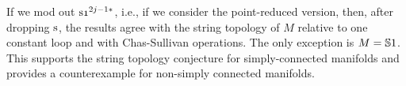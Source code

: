\documentclass[\MainFolder/Text.tex]{subfiles}
\begin{document}
If we mod out $\Susp \NOne^{2j-1*}$, i.e., if we consider the point-reduced version, then, after dropping $\mathrm{s}$, the results agree with the string topology of $M$ relative to one constant loop and with Chas-Sullivan operations. The only exception is $M=\mathbb{S}{1}$. This supports the string topology conjecture for simply-connected manifolds and provides a counterexample for non-simply connected manifolds.



%
%

%
%
%
\end{document}
